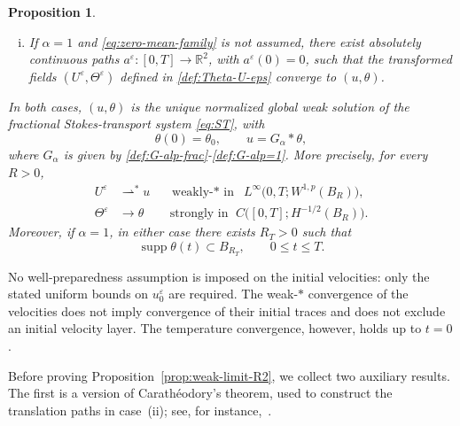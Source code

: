 \documentclass[reqno,11pt,a4paper]{amsart}
\newtheorem{proposition}[theorem]{Proposition}
\begin{document}
\begin{proposition}
\begin{enumerate}[(i)]
\item
If $\alpha=1$ and \eqref{eq:zero-mean-family} is not assumed,
there exist absolutely continuous paths
$a^\varepsilon:[0,T]\to\mathbb R^2$,
with $a^\varepsilon(0)=0$, such that the transformed fields
$(U^\varepsilon,\Theta^\varepsilon)$ defined in
\eqref{def:Theta-U-eps} converge to $(u,\theta)$.
\end{enumerate}
In both cases, $(u,\theta)$ is the unique normalized global
weak solution of the fractional Stokes-transport system
\eqref{eq:ST}, with
\[
  \theta(0)=\theta_0,
  \qquad u=G_\alpha*\theta,
\]
where $G_\alpha$ is given by
\eqref{def:G-alp-frac}-\eqref{def:G-alp=1}.
More precisely, for every $R>0$,
\begin{equation}\label{eq:U-The-eps-conv-gen}
\begin{aligned}
  U^\varepsilon
  &\rightharpoonup^\ast u
  &&\text{weakly-$*$ in }\;
  L^\infty\bigl(0,T;W^{1,p}(B_R)\bigr),
  \\
  \Theta^\varepsilon
  &\longrightarrow\theta
  &&\text{strongly in }\;
  C\bigl([0,T];H^{-1/2}(B_R)\bigr).
\end{aligned}
\end{equation}
Moreover, if $\alpha=1$, in either case there exists $R_T>0$ such that
\begin{equation}\label{eq:theta-supp}
  \operatorname{supp}\theta(t)\subset B_{R_T},
  \qquad 0\leq t\leq T.
\end{equation}
\end{proposition}

No well-preparedness assumption is imposed on the initial
velocities: only the stated uniform bounds on
$u_0^\varepsilon$ are required.
The weak-$*$ convergence of the velocities does not
imply convergence of their initial traces
and does not exclude an initial velocity layer.
The temperature convergence, however, holds up to $t=0$.


Before proving Proposition~\ref{prop:weak-limit-R2},
we collect two auxiliary results.
The first is a version of Carath\'eodory's theorem,
used to construct the translation paths in case~(ii);
see, for instance,~\cite[Chapter~2]{CL55}.
\end{document}
